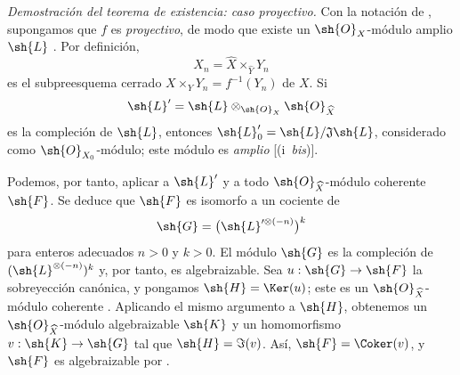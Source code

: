 \documentclass[oneside]{amsart}
\makeatletter
\newcommand{\ega@arrow}[2]{\mathchoice{#1}{#2}{#2}{#2}}
\renewcommand{\to}{\ega@arrow{\longrightarrow}{\rightarrow}}
\let\EGAOriginalLabel\label
\renewcommand{\label}[1]{\phantomsection\EGAOriginalLabel{#1}}
\makeatother
\begin{document}
\begin{env}[5.2.5]
\label{III.5.2.5}
\emph{Demostración del teorema de existencia: caso proyectivo.}
Con la notación de , supongamos que $f$ es
\emph{proyectivo}, de modo que existe un $\sh{O}_X$-módulo amplio $\sh{L}$
. Por definición,
\[
  X_n=\widehat{X}\times_{\widehat{Y}}Y_n
\]
es el subpreesquema cerrado
$X\times_Y Y_n=f^{-1}(Y_n)$ de $X$. Si
\[
  \sh{L}'=\sh{L}\otimes_{\sh{O}_X}\sh{O}_{\widehat{X}}
\]
es la compleción de $\sh{L}$, entonces
$\sh{L}'_0=\sh{L}/\mathfrak{J}\sh{L}$, considerado como
$\sh{O}_{X_0}$-módulo; este módulo es \emph{amplio}
[(i~\emph{bis})].

Podemos, por tanto, aplicar  a $\sh{L}'$ y a todo
$\sh{O}_{\widehat{X}}$-módulo coherente $\sh{F}$. Se deduce que
$\sh{F}$ es isomorfo a un cociente de
\[
  \sh{G}=
  \bigl(\sh{L}'^{\otimes(-n)}\bigr)^k
\]
para enteros adecuados $n>0$ y $k>0$. El módulo $\sh{G}$ es la
compleción de $(\sh{L}^{\otimes(-n)})^k$
 y, por tanto, es algebraizable. Sea
$u:\sh{G}\to\sh{F}$ la sobreyección canónica, y pongamos
$\sh{H}=\Ker(u)$; este es un
$\sh{O}_{\widehat{X}}$-módulo coherente . Aplicando el mismo
argumento a $\sh{H}$, obtenemos un
$\sh{O}_{\widehat{X}}$-módulo algebraizable $\sh{K}$ y un homomorfismo
$v:\sh{K}\to\sh{G}$ tal que $\sh{H}=\Im(v)$. Así,
$\sh{F}=\Coker(v)$, y $\sh{F}$ es algebraizable por
.
\end{env}
\end{document}
